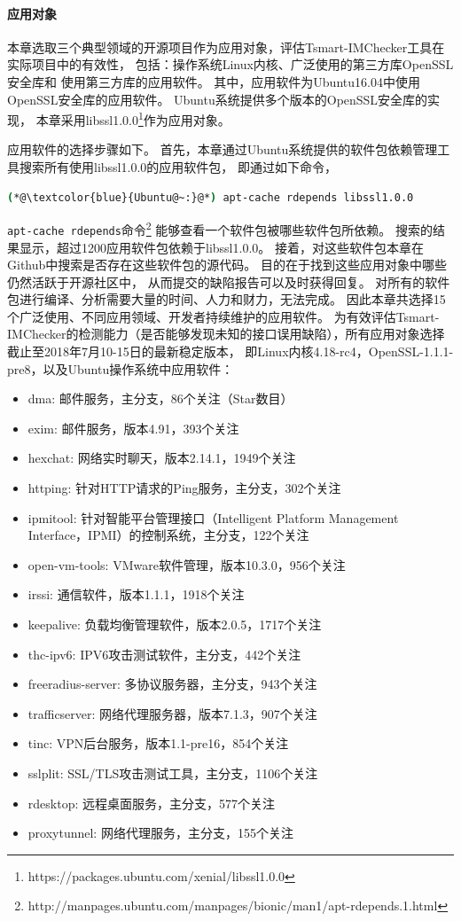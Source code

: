 \paragraph{应用对象}
本章选取三个典型领域的开源项目作为应用对象，评估Tsmart-IMChecker工具在实际项目中的有效性，
包括：操作系统Linux内核、广泛使用的第三方库OpenSSL安全库和
使用第三方库的应用软件。
其中，应用软件为Ubuntu16.04中使用OpenSSL安全库的应用软件。
Ubuntu系统提供多个版本的OpenSSL安全库的实现，
本章采用libssl1.0.0\footnote{https://packages.ubuntu.com/xenial/libssl1.0.0}作为应用对象。

应用软件的选择步骤如下。
首先，本章通过Ubuntu系统提供的软件包依赖管理工具搜索所有使用libssl1.0.0的应用软件包，
即通过如下命令，
\begin{lstlisting}[language={bash},
basicstyle=\linespread{0.8}\listingsfont,
numbers=none,
xleftmargin=.25\textwidth]
(*@\textcolor{blue}{Ubuntu@~:}@*) apt-cache rdepends libssl1.0.0
\end{lstlisting}
\texttt{apt-cache rdepends}命令\footnote{http://manpages.ubuntu.com/manpages/bionic/man1/apt-rdepends.1.html}
能够查看一个软件包被哪些软件包所依赖。
搜索的结果显示，超过1200应用软件包依赖于libssl1.0.0。
接着，对这些软件包本章在Github中搜索是否存在这些软件包的源代码。
目的在于找到这些应用对象中哪些仍然活跃于开源社区中，
从而提交的缺陷报告可以及时获得回复。
对所有的软件包进行编译、分析需要大量的时间、人力和财力，无法完成。
因此本章共选择15个广泛使用、不同应用领域、开发者持续维护的应用软件。
为有效评估Tsmart-IMChecker的检测能力（是否能够发现未知的接口误用缺陷），所有应用对象选择截止至2018年7月10-15日的最新稳定版本，
即Linux内核4.18-rc4，OpenSSL-1.1.1-pre8，以及Ubuntu操作系统中应用软件：
\begin{itemize}
	\item dma: 邮件服务，主分支，86个关注（Star数目）
	\item exim: 邮件服务，版本4.91，393个关注
	\item hexchat: 网络实时聊天，版本2.14.1，1949个关注
	\item httping: 针对HTTP请求的Ping服务，主分支，302个关注
	\item ipmitool: 针对智能平台管理接口（Intelligent Platform Management Interface，IPMI）的控制系统，主分支，122个关注
	\item open-vm-tools: VMware软件管理，版本10.3.0，956个关注
	\item irssi: 通信软件，版本1.1.1，1918个关注
	\item keepalive: 负载均衡管理软件，版本2.0.5，1717个关注
	\item thc-ipv6: IPV6攻击测试软件，主分支，442个关注
	\item freeradius-server: 多协议服务器，主分支，943个关注
	\item trafficserver: 网络代理服务器，版本7.1.3，907个关注
	\item tinc: VPN后台服务，版本1.1-pre16，854个关注
	\item sslplit: SSL/TLS攻击测试工具，主分支，1106个关注
	\item rdesktop: 远程桌面服务，主分支，577个关注
	\item proxytunnel: 网络代理服务，主分支，155个关注
\end{itemize}

